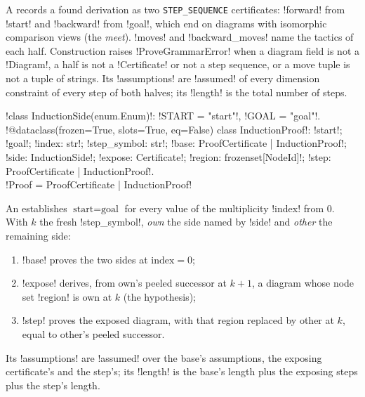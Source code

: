 \begin{definition}\label{def:proofs-proof-certificate}
A  records a found derivation as two \texttt{STEP\_SEQUENCE} certificates: \py!forward! from \py!start! and \py!backward! from \py!goal!, which end on diagrams with isomorphic comparison views (the \emph{meet}). \py!moves! and \py!backward_moves! name the tactics of each half. Construction raises \py!ProveGrammarError! when a diagram field is not a \py!Diagram!, a half is not a \py!Certificate! or not a step sequence, or a move tuple is not a tuple of strings. Its \py!assumptions! are \py!assumed! of every dimension constraint of every step of both halves; its \py!length! is the total number of steps.
\end{definition}

\begin{signature}
\py!class InductionSide(enum.Enum)!: \py!START = "start"!, \py!GOAL = "goal"!.\\
\py!@dataclass(frozen=True, slots=True, eq=False) class InductionProof!: \py!start!; \py!goal!; \py!index: str!; \py!step_symbol: str!; \py!base: ProofCertificate | InductionProof!; \py!side: InductionSide!; \py!expose: Certificate!; \py!region: frozenset[NodeId]!; \py!step: ProofCertificate | InductionProof!.\\
\py!Proof = ProofCertificate | InductionProof!
\end{signature}

\begin{definition}\label{def:proofs-induction-proof}
An  establishes $\text{start}=\text{goal}$ for every value of the multiplicity \py!index! from $0$. With $k$ the fresh \py!step_symbol!, \emph{own} the side named by \py!side! and \emph{other} the remaining side:
\begin{enumerate}
\item \py!base! proves the two sides at $\text{index}=0$;
\item \py!expose! derives, from own's peeled successor at $k+1$, a diagram whose node set \py!region! is own at $k$ (the hypothesis);
\item \py!step! proves the exposed diagram, with that region replaced by other at $k$, equal to other's peeled successor.
\end{enumerate}
Its \py!assumptions! are \py!assumed! over the base's assumptions, the exposing certificate's and the step's; its \py!length! is the base's length plus the exposing steps plus the step's length.
\end{definition}

